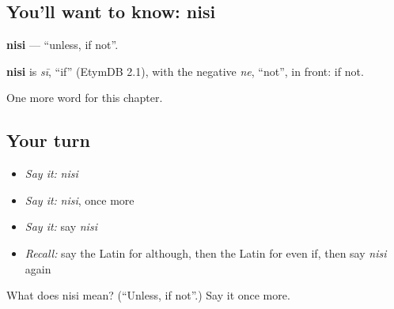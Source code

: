 \subsection*{You'll want to know: nisi}
\textbf{nisi} — \textquotedblleft{}unless, if not\textquotedblright{}.

\begin{cousinweb}
\textbf{nisi} is \emph{sī}, \textquotedblleft{}if\textquotedblright{} (EtymDB 2.1), with the negative \emph{ne}, \textquotedblleft{}not\textquotedblright{}, in front: if not.
\end{cousinweb}

\begin{grammarlens}[title={What you've built}]
One more word for this chapter.
\end{grammarlens}

\subsection*{Your turn}
\begin{itemize}
\raggedright
  \item \emph{Say it:} \emph{nisi}
  \item \emph{Say it:} \emph{nisi}, once more
  \item \emph{Say it:} say \emph{nisi}
  \item \emph{Recall:} say the Latin for although, then the Latin for even if, then say \emph{nisi} again
\end{itemize}

\begin{tcolorbox}[breakable,colback=teal!4,colframe=teal!35!black,title={Before you move on}]
What does nisi mean? (\textquotedblleft{}Unless, if not\textquotedblright{}.) Say it once more.
\end{tcolorbox}
